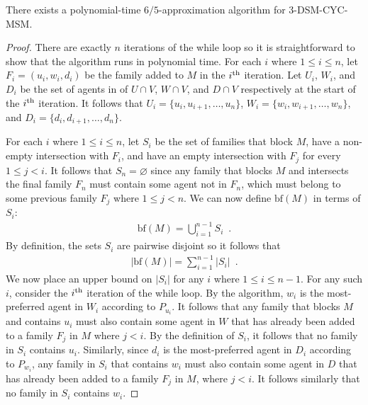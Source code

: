 \begin{thm}
\label{thm:three_dsm_cyc_unrestricted}
There exists a polynomial-time $6/5$-approximation algorithm for 3-DSM-CYC-MSM.
\end{thm}
\begin{proof}
There are exactly $n$ iterations of the while loop so it is straightforward to show that the algorithm runs in polynomial time. For each $i$ where $1\leq i \leq n$, let $F_i = ( u_i, w_i, d_i )$ be the family added to $M$ in the $i\textsuperscript{th}$ iteration. Let $U_i$, $W_i$, and $D_i$ be the set of agents in of $U \cap V$, $W \cap V$, and $D \cap V$ respectively at the start of the $i\textsuperscript{th}$ iteration. It follows that $U_i = \{ u_i, u_{i+1}, \dots, u_n \}$, $W_i = \{ w_i, w_{i+1}, \dots, w_n \}$, and $D_i = \{ d_i, d_{i+1}, \dots, d_n \}$.

For each $i$ where $1\leq i \leq n$, let $S_i$ be the set of families that block $M$, have a non-empty intersection with $F_i$, and have an empty intersection with $F_j$ for every $1 \leq j < i$. It follows that $S_n = \varnothing$ since any family that blocks $M$ and intersects the final family $F_n$ must contain some agent not in $F_n$, which must belong to some previous family $F_j$ where $1 \leq j < n$. 
We can now define $\text{bf}(M)$ in terms of $S_i$:
\begin{align*}
    \text{bf}(M) = \bigcup\limits_{i=1}^{n-1} S_i\enspace.
\end{align*}
By definition, the sets $S_i$ are pairwise disjoint so it follows that
\begin{align}
    |\text{bf}(M)| = \sum\limits_{i=1}^{n-1} |S_i|\enspace. \label{eqn:threedsm_cyc_si}
\end{align}
We now place an upper bound on $|S_i|$ for any $i$ where $1\leq i \leq n - 1$. For any such $i$, consider the $i\textsuperscript{th}$ iteration of the while loop. By the algorithm, $w_i$ is the most-preferred agent in $W_i$ according to $P_{u_i}$. It follows that any family that blocks $M$ and contains $u_i$ must also contain some agent in $W$ that has already been added to a family $F_j$ in $M$ where $j < i$. By the definition of $S_i$, it follows that no family in $S_i$ contains $u_i$. Similarly, since $d_i$ is the most-preferred agent in $D_i$ according to $P_{w_i}$, any family in $S_i$ that contains $w_i$ must also contain some agent in $D$ that has already been added to a family $F_j$ in $M$, where $j < i$. It follows similarly that no family in $S_i$ contains $w_i$.


\end{proof}
